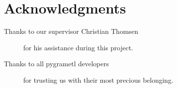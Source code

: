 \section*{Acknowledgments} %


\begin{description}
\item[Thanks to our supervisor Christian Thomsen] for his assistance during this project. 
\item[Thanks to all pygrametl developers] for trusting us with their most precious belonging. 
\end{description}